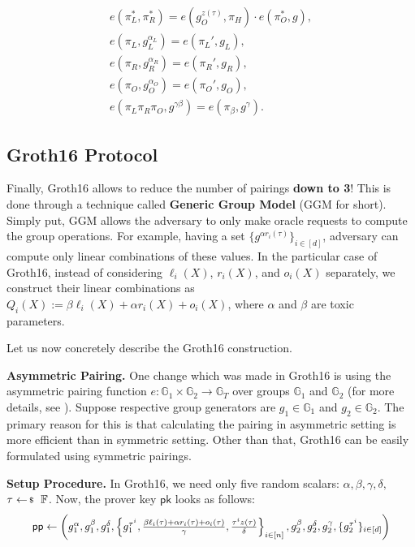 \documentclass[../lecture-notes-148x210.tex]{subfiles}
\begin{document}
\begin{tcolorbox}
\begin{itemize}[label=]
    \end{itemize}
    \begin{align*}
        e(\pi_L^*, \pi_R^*) = e(g_O^{z(\tau)}, \pi_H)\cdot e(\pi_O^*, g), \\
        e(\pi_L, g_L^{\alpha_L}) = e(\pi_L', g_L), \\
        e(\pi_R, g_R^{\alpha_R}) = e(\pi_R', g_R), \\
        e(\pi_O, g_O^{\alpha_O}) = e(\pi_O', g_O), \\
        e(\pi_L\pi_R\pi_O, g^{\gamma\beta}) = e(\pi_{\beta}, g^{\gamma}).
    \end{align*}
\end{tcolorbox}

\subsection{Groth16 Protocol}

Finally, Groth16 \cite{groth16} allows to reduce the number of pairings \textbf{down to 3}! This is done through a technique called \textbf{Generic Group Model} (GGM for short). Simply put, GGM allows the adversary to only make oracle requests to compute the group operations. For example, having a set $\{g^{\alpha r_i(\tau)}\}_{i \in [d]}$, adversary can compute only linear combinations of these values. In the particular case of Groth16, instead of considering $\ell_i(X)$, $r_i(X)$, and $o_i(X)$ separately, we construct their linear combinations as $Q_i(X) := \beta \ell_i(X) + \alpha r_i(X) + o_i(X)$, where $\alpha$ and $\beta$ are toxic parameters.

Let us now concretely describe the Groth16 construction.

\textcolor{gray!75!black}{\textbf{Asymmetric Pairing.}} One change which was made in Groth16 is using the asymmetric pairing function $e: \mathbb{G}_1 \times \mathbb{G}_2 \to \mathbb{G}_T$ over groups $\mathbb{G}_1$ and $\mathbb{G}_2$ (for more details, see ). Suppose respective group generators are $g_1 \in \mathbb{G}_1$ and $g_2 \in \mathbb{G}_2$. The primary reason for this is that calculating the pairing in asymmetric setting is more efficient than in symmetric setting. Other than that, Groth16 can be easily formulated using symmetric pairings.

\textcolor{blue!75!gray}{\textbf{Setup Procedure.}} In Groth16, we need only five random scalars: $\alpha,\beta,\gamma,\delta,$ \\ $\tau \leftarrowS \mathbb{F}$. Now, the prover key $\mathsf{pk}$ looks as follows:
\begin{equation*}
    \scalebox{0.95}{$
        \mathsf{pp} \gets \left(g_1^{\alpha},g_1^{\beta},g_1^{\delta},\left\{g_1^{\tau^i},\frac{\beta \ell_i(\tau) + \alpha r_i(\tau) + o_i(\tau)}{\gamma}, \frac{\tau^i z(\tau)}{\delta}\right\}_{i \in [n]},g_2^{\beta}, g_2^{\delta}, g_2^{\gamma}, \{g_2^{\tau^i}\}_{i \in [d]}\right)
    $}
\end{equation*}
\end{document}
